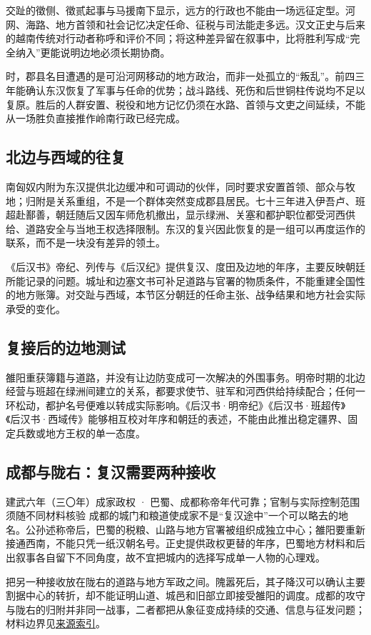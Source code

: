 交趾的徵侧、徵贰起事与马援南下显示，远方的行政也不能由一场远征定型。河网、海路、地方首领和社会记忆决定任命、征税与司法能走多远。汉文正史与后来的越南传统对行动者称呼和评价不同；将这种差异留在叙事中，比将胜利写成“完全纳入”更能说明边地必须长期协商。

时，郡县名目遭遇的是可沿河网移动的地方政治，而非一处孤立的“叛乱”。前四三年能确认东汉恢复了军事与任命的优势；战斗路线、死伤和后世铜柱传说均不足以复原。胜后的人群安置、税役和地方记忆仍须在水路、首领与文吏之间延续，不能从一场胜负直接推作岭南行政已经完成。

\subsection{北边与西域的往复}

南匈奴内附为东汉提供北边缓冲和可调动的伙伴，同时要求安置首领、部众与牧地；归附是关系重组，不是一个群体突然变成郡县居民。七十三年进入伊吾卢、班超赴鄯善，朝廷随后又因车师危机撤出，显示绿洲、关塞和都护职位都受河西供给、道路安全与当地王权选择限制。东汉的复兴因此恢复的是一组可以再度运作的联系，而不是一块没有差异的领土。

\begin{sourcenote}[“复兴”的尺度]
《后汉书》帝纪、列传与《后汉纪》提供复汉、度田及边地的年序，主要反映朝廷所能记录的问题。城址和边塞文书可补足道路与官署的物质条件，不能重建全国性的地方账簿。对交趾与西域，本节区分朝廷的任命主张、战争结果和地方社会实际承受的变化。
\end{sourcenote}
\subsection{复接后的边地测试}

雒阳重获簿籍与道路，并没有让边防变成可一次解决的外围事务。明帝时期的北边经营与班超在绿洲间建立的关系，都要求使节、驻军和河西供给持续配合；任何一环松动，都护名号便难以转成实际影响。《后汉书·明帝纪》《后汉书·班超传》《后汉书·西域传》能够相互校对年序和朝廷的表述，不能由此推出稳定疆界、固定兵数或地方王权的单一态度。

\subsection{成都与陇右：复汉需要两种接收}
\begin{event}{}{建武六年（三〇年）}{成家政权 · 巴蜀、成都}{称帝年代可靠；官制与实际控制范围须随不同材料核验}
成都的城门和粮道使成家不是“复汉途中”一个可以略去的地名。公孙述称帝后，巴蜀的税粮、山路与地方官署被组织成独立中心；雒阳要重新接通西南，不能只凭一纸汉朝名号。正史提供政权更替的年序，巴蜀地方材料和后出叙事各自留下不同角度，故不宜把城内的选择写成单一人物的心理戏。

把另一种接收放在陇右的道路与地方军政之间。隗嚣死后，其子降汉可以确认主要割据中心的转折，却不能证明山道、城邑和旧部立即接受雒阳的调度。成都的攻守与陇右的归附并非同一战事，二者都把从象征变成持续的交通、信息与征发问题；材料边界见\hyperref[app:sources]{来源索引}。
\end{event}
